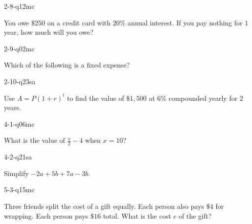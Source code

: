 \begin{practiceQuestion}{2-8-q12}{mc}
\begin{questionText}
You owe $\$250$ on a credit card with $20\%$ annual interest. If you pay nothing for $1$ year, how much will you owe?
\end{questionText}
\end{practiceQuestion}

\begin{practiceQuestion}{2-9-q02}{mc}
\begin{questionText}
Which of the following is a fixed expense?
\end{questionText}
\end{practiceQuestion}

\begin{practiceQuestion}{2-10-q23}{sa}
\begin{questionText}
Use $A = P(1 + r)^t$ to find the value of $\$1{,}500$ at $6\%$ compounded yearly for $2$ years.
\end{questionText}
\end{practiceQuestion}

\begin{practiceQuestion}{4-1-q06}{mc}
\begin{questionText}
What is the value of $\frac{x}{2} - 4$ when $x = 10$?
\end{questionText}
\end{practiceQuestion}

\begin{practiceQuestion}{4-2-q21}{sa}
\begin{questionText}
Simplify $-2a + 5b + 7a - 3b$.
\end{questionText}
\end{practiceQuestion}

\begin{practiceQuestion}{5-3-q15}{mc}
\begin{questionText}
Three friends split the cost of a gift equally. Each person also pays $\$4$ for wrapping. Each person pays $\$16$ total. What is the cost $c$ of the gift?
\end{questionText}
\end{practiceQuestion}

